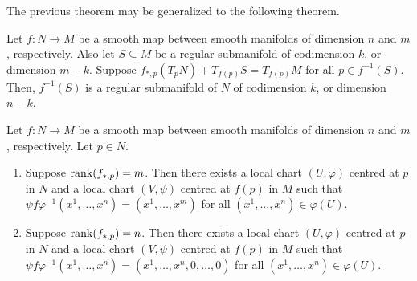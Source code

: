 The previous theorem may be generalized to the following theorem.

\begin{theorem}
    Let $f:N \to M$ be a smooth map between smooth manifolds of dimension $n$ and $m$, respectively. Also let $S \subseteq M$ be a regular submanifold of codimension $k$, or dimension $m-k$. Suppose $f_{\ast,p}(T_{p}N) + T_{f(p)}S = T_{f(p)}M$ for all $p \in f^{-1}(S)$. Then, $f^{-1}(S)$ is a regular submanifold of $N$ of codimension $k$, or dimension $n-k$.
\end{theorem}


\begin{theorem}
    Let $f:N \to M$ be a smooth map between smooth manifolds of dimension $n$ and $m$, respectively. Let $p \in N$.
    \begin{enumerate}
        \item Suppose $\operatorname{rank}(f_{\ast,p}) = m$. Then there exists a local chart $(U,\varphi)$ centred at $p$ in $N$ and a local chart $(V,\psi)$ centred at $f(p)$ in $M$ such that $\psi f \varphi^{-1}(x^{1},\ldots,x^{n}) = (x^{1},\ldots,x^{m})$ for all $(x^{1},\ldots,x^{n}) \in \varphi(U)$.
        \item Suppose $\operatorname{rank}(f_{\ast,p}) = n$. Then there exists a local chart $(U,\varphi)$ centred at $p$ in $N$ and a local chart $(V,\psi)$ centred at $f(p)$ in $M$ such that $\psi f \varphi^{-1}(x^{1},\ldots,x^{n}) = (x^{1},\ldots,x^{n},0,\ldots,0)$ for all $(x^{1},\ldots,x^{n}) \in \varphi(U)$.
    \end{enumerate}
\end{theorem}

